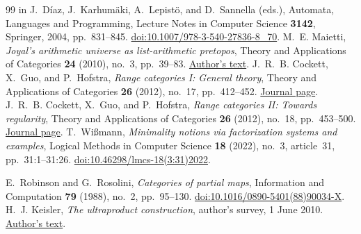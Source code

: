 \documentclass[11pt]{article}
\theoremstyle{definition}\newtheorem{definition}[theorem]{Definition}
\begin{document}
\begin{thebibliography}{99}
in J.~D\'iaz, J.~Karhum\"aki, A.~Lepist\"o, and D.~Sannella (eds.),
Automata, Languages and Programming, Lecture Notes in Computer Science
\textbf{3142}, Springer, 2004, pp.~831--845.
\href{https://doi.org/10.1007/978-3-540-27836-8_70}{doi:10.1007/978-3-540-27836-8\_70}.
M.~E. Maietti, \emph{Joyal's arithmetic universe as list-arithmetic pretopos},
Theory and Applications of Categories \textbf{24} (2010),
no.~3, pp.~39--83.
\href{https://www.math.unipd.it/~maietti/papers/jartacrev.pdf}{Author's text}.
J.~R.~B. Cockett, X.~Guo, and P.~Hofstra,
\emph{Range categories I: General theory},
Theory and Applications of Categories \textbf{26} (2012),
no.~17, pp.~412--452.
\href{https://www.tac.mta.ca/tac/volumes/26/17/26-17abs.html}{Journal page}.
J.~R.~B. Cockett, X.~Guo, and P.~Hofstra,
\emph{Range categories II: Towards regularity},
Theory and Applications of Categories \textbf{26} (2012),
no.~18, pp.~453--500.
\href{https://www.tac.mta.ca/tac/volumes/26/18/26-18abs.html}{Journal page}.
T.~Wi\ss{}mann, \emph{Minimality notions via factorization systems and examples},
Logical Methods in Computer Science \textbf{18} (2022),
no.~3, article~31, pp.~31:1--31:26.
\href{https://doi.org/10.46298/lmcs-18(3:31)2022}{doi:10.46298/lmcs-18(3:31)2022}.

E.~Robinson and G.~Rosolini, \emph{Categories of partial maps},
Information and Computation \textbf{79} (1988), no.~2, pp.~95--130.
\href{https://doi.org/10.1016/0890-5401(88)90034-X}{doi:10.1016/0890-5401(88)90034-X}.
H.~J. Keisler, \emph{The ultraproduct construction},
author's survey, 1 June 2010.
\href{https://people.math.wisc.edu/~hkeisler/ultraproducts-web-final.pdf}{Author's text}.
\end{thebibliography}
\end{document}
